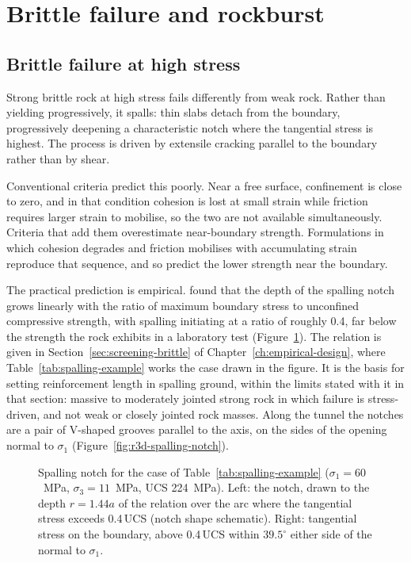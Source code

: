 \section{Brittle failure and rockburst}
\label{sec:brittle-rockburst}

\subsection{Brittle failure at high stress}
\label{sec:brittle-failure}

Strong brittle rock at high stress fails differently from weak rock. Rather
than yielding progressively, it spalls: thin slabs detach from the boundary,
progressively deepening a characteristic notch where the tangential stress is
highest. The process is driven by extensile cracking parallel to the boundary
rather than by shear.

Conventional criteria predict this poorly.
Near a free surface, confinement is close to zero, and in that condition
cohesion is lost at small strain while friction requires larger strain to
mobilise, so the two are not available simultaneously. Criteria that add
them overestimate near-boundary strength. Formulations in which cohesion
degrades and friction mobilises with accumulating strain reproduce that
sequence, and so predict the lower strength near the boundary.

The practical prediction is empirical. \citet{martin1999spalling} found
that the depth of the spalling notch grows linearly with the ratio of maximum
boundary stress to unconfined compressive strength, with spalling initiating
at a ratio of roughly 0.4, far below the strength the rock exhibits in a
laboratory test (Figure~\ref{fig:spalling-notch}). The relation is given in
Section~\ref{sec:screening-brittle} of Chapter~\ref{ch:empirical-design},
where Table~\ref{tab:spalling-example} works the case drawn in the figure.
It is the basis for setting reinforcement length
in spalling ground, within the limits stated with it in that section: massive to moderately jointed strong
rock in which failure is stress-driven, and not weak or closely jointed rock
masses. Along the tunnel the notches are a pair of V-shaped grooves parallel
to the axis, on the sides of the opening normal to $\sigma_1$
(Figure~\ref{fig:r3d-spalling-notch}).

\begin{figure}[htbp]
\centering
{}
\caption{Spalling notch for the case of Table~\ref{tab:spalling-example} ($\sigma_1 = 60$~MPa, $\sigma_3 = 11$~MPa, UCS 224~MPa). Left: the notch, drawn to the depth $r = 1.44a$ of the relation over the arc where the tangential stress exceeds 0.4\,UCS (notch shape schematic). Right: tangential stress on the boundary, above 0.4\,UCS within $39.5^\circ$ either side of the normal to $\sigma_1$.}
\label{fig:spalling-notch}
\end{figure}

